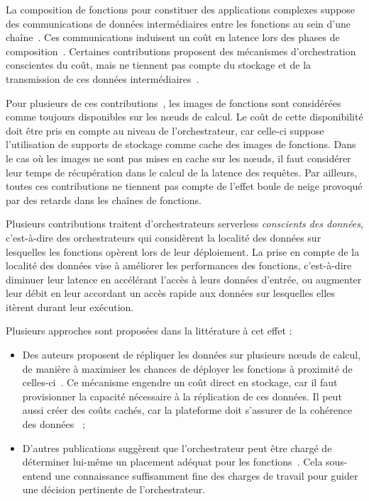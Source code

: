 La composition de fonctions pour constituer des applications complexes suppose des communications de données intermédiaires entre les fonctions au sein d'une chaîne~\cite{vaneykSPECRGReferenceArchitecture2019}. Ces communications induisent un coût en latence lors des phases de composition~\cite{jiaNightcoreEfficientScalable2021}. Certaines contributions proposent des mécanismes d'orchestration conscientes du coût, mais ne tiennent pas compte du stockage et de la transmission de ces données intermédiaires~\cite{zhangFIRSTExploitingMultiDimensional2023, zijunFassflowEfficient2022, herofake}.

Pour plusieurs de ces contributions~\cite{bhasiCypressInputSizesensitive2022, zijunFassflowEfficient2022, smithFaDOFaaSFunctions2022, zhangFIRSTExploitingMultiDimensional2023}, les images de fonctions sont considérées comme toujours disponibles sur les nœuds de calcul. Le coût de cette disponibilité doit être pris en compte au niveau de l'orchestrateur, car celle-ci suppose l'utilisation de supports de stockage comme cache des images de fonctions. Dans le cas où les images ne sont pas mises en cache sur les nœuds, il faut considérer leur temps de récupération dans le calcul de la latence des requêtes. Par ailleurs, toutes ces contributions ne tiennent pas compte de l'effet boule de neige provoqué par des retards dans les chaînes de fonctions.

Plusieurs contributions traitent d'orchestrateurs serverless \textit{conscients des données}, c'est-à-dire des orchestrateurs qui considèrent la localité des données sur lesquelles les fonctions opèrent lors de leur déploiement. La prise en compte de la localité des données vise à améliorer les performances des fonctions, c'est-à-dire diminuer leur latence en accélérant l'accès à leurs données d'entrée, ou augmenter leur débit en leur accordant un accès rapide aux données sur lesquelles elles itèrent durant leur exécution.

Plusieurs approches sont proposées dans la littérature à cet effet :

\begin{itemize}
    \item Des auteurs proposent de répliquer les données sur plusieurs nœuds de calcul, de manière à maximiser les chances de déployer les fonctions à proximité de celles-ci~\cite{smithFaDOFaaSFunctions2022}. Ce mécanisme engendre un coût direct en stockage, car il faut provisionner la capacité nécessaire à la réplication de ces données. Il peut aussi créer des coûts cachés, car la plateforme doit s'assurer de la cohérence des données~\cite{wuTransactionalCausalConsistency2020} ;
    \item D'autres publications suggèrent que l'orchestrateur peut être chargé de déterminer lui-même un placement adéquat pour les fonctions~\cite{abdiPaletteLoadBalancing2023}. Cela sous-entend une connaissance suffisamment fine des charges de travail pour guider une décision pertinente de l'orchestrateur.
\end{itemize}

